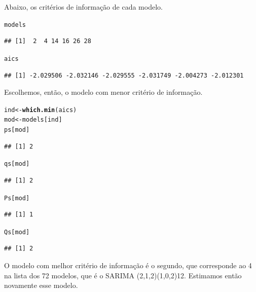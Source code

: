 \documentclass{article}\usepackage[]{graphicx}\usepackage[]{color}
\makeatletter
\newcommand{\hlstd}[1]{\textcolor[rgb]{0.345,0.345,0.345}{#1}}%
\newcommand{\hlkwb}[1]{\textcolor[rgb]{0.69,0.353,0.396}{#1}}%
\newcommand{\hlkwd}[1]{\textcolor[rgb]{0.737,0.353,0.396}{\textbf{#1}}}%
\newenvironment{kframe}{%
 \def\at@end@of@kframe{}%
 \ifinner\ifhmode%
  \def\at@end@of@kframe{\end{minipage}}%
  \begin{minipage}{\columnwidth}%
 \fi\fi%
 \def\FrameCommand##1{\hskip\@totalleftmargin \hskip-\fboxsep
 \colorbox{shadecolor}{##1}\hskip-\fboxsep
     \hskip-\linewidth \hskip-\@totalleftmargin \hskip\columnwidth}%
 \MakeFramed {\advance\hsize-\width
   \@totalleftmargin\z@ \linewidth\hsize
   \@setminipage}}%
 {\par\unskip\endMakeFramed%
 \at@end@of@kframe}
\newenvironment{knitrout}{}{} %
\makeatother
\begin{document}
        Abaixo, os critérios de informação de cada modelo.

\begin{knitrout}
\color{fgcolor}\begin{kframe}
\begin{alltt}
\hlstd{models}
\end{alltt}
\begin{verbatim}
## [1]  2  4 14 16 26 28
\end{verbatim}
\begin{alltt}
\hlstd{aics}
\end{alltt}
\begin{verbatim}
## [1] -2.029506 -2.032146 -2.029555 -2.031749 -2.004273 -2.012301
\end{verbatim}
\end{kframe}
\end{knitrout}

        Escolhemos, então, o modelo com menor critério de informação.

\begin{knitrout}
\color{fgcolor}\begin{kframe}
\begin{alltt}
\hlstd{ind} \hlkwb{<-} \hlkwd{which.min}\hlstd{(aics)}
\hlstd{mod} \hlkwb{<-} \hlstd{models[ind]}
\hlstd{ps[mod]}
\end{alltt}
\begin{verbatim}
## [1] 2
\end{verbatim}
\begin{alltt}
\hlstd{qs[mod]}
\end{alltt}
\begin{verbatim}
## [1] 2
\end{verbatim}
\begin{alltt}
\hlstd{Ps[mod]}
\end{alltt}
\begin{verbatim}
## [1] 1
\end{verbatim}
\begin{alltt}
\hlstd{Qs[mod]}
\end{alltt}
\begin{verbatim}
## [1] 2
\end{verbatim}
\end{kframe}
\end{knitrout}

        O modelo com melhor critério de informação é o segundo, que corresponde ao 4 na lista dos 72 modelos, que é o SARIMA (2,1,2)(1,0,2)12. Estimamos então novamente esse modelo.
            
\end{document}
